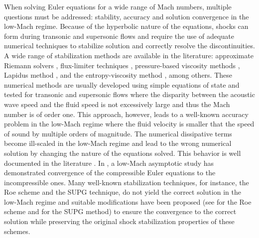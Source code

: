\documentclass[review,10pt]{elsarticle}
\newcommand{\tcr}[1]{\textcolor{red}{#1}}
\begin{document}
When solving Euler equations for a wide range of Mach numbers, multiple questions must be addressed: stability, 
accuracy and solution convergence in the low-Mach regime. Because of the hyperbolic nature of the equations, 
shocks can form during transonic and supersonic flows and require the use of adequate numerical techniques to stabilize solution
and correctly resolve the discontinuities. A wide range of stabilization methods are available in the literature: approximate Riemann solvers \cite{Toro}, flux-limiter techniques 
\cite{FluxLimiter, FluxLimiter2}, pressure-based viscosity methods \cite{PBV_book}, Lapidus method \cite{Lapidus_paper, LMP, Lapidus_book}, 
and the entropy-viscosity method \cite{jlg1, jlg2}, among others. These numerical methods are usually developed using simple equations 
of state and tested for transonic and supersonic flows where the disparity between the acoustic wave speed and the fluid speed is not 
excessively large and thus the Mach number is of order one. This approach, however, leads to a well-known accuracy problem in the low-Mach regime 
where the fluid velocity is smaller that the speed of sound by multiple orders of magnitude. The numerical dissipative terms become 
ill-scaled in the low-Mach regime and lead to the wrong numerical solution by changing the nature of the equations solved. This 
behavior is well documented in the literature \cite{LowMach1, LowMach2, LowMach3}.
In \cite{LowMach1}, a low-Mach asymptotic study has demonstrated convergence of the 
compressible Euler equations to the incompressible ones. 
Many well-known stabilization techniques, for instance, the Roe scheme and the SUPG technique,
do not yield the correct solution in the low-Mach regime and suitable modifications have been proposed (see \cite{Roe} for the Roe scheme and \cite{LowMach3} for the SUPG method)
to ensure the convergence to the correct solution while preserving the original shock stabilization 
properties of these schemes. 
%
\end{document}
